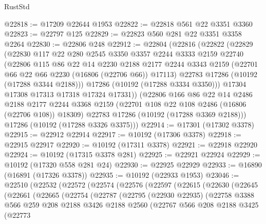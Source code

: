 \begin{lexlean}{RustStd}
\begin{coremodule}
@22818 := @17209 @22644 @1953
@22822 := @22818 @561 @22 @3351 @3360
@22823 := @22797 @125
@22829 := @22823 @560 @281 @22 @3351 @3358 @2264
@22830 := @22806 @248
@22912 := @22804
    (@22816
      (@22822
        (@22829
          (@22830
            @117
            @22
            @280
            @2545
            @3350
            @3357
            @2244
            @3333
            @2159
            @22740
            (@22806
              @115
              @86
              @22
              @14
              @2230
              @2188
              @2177
              @2244
              @3343
              @2159
              (@22701 @66 @22 @66 @2230 (@16806 (@22706 @66)) @17113)
              @22783
              @17286
              (@10192 (@17288 @3344 @2188)))
            @17286
            (@10192 (@17288 @3334 @3350)))
          @17304
          @17308
          @17313
          @17318
          @17324
          @17331))
      (@22806
        @166
        @86
        @22
        @14
        @2486
        @2188
        @2177
        @2244
        @3368
        @2159
        (@22701 @108 @22 @108 @2486 (@16806 (@22706 @108)) @18309)
        @22783
        @17286
        (@10192 (@17288 @3369 @2188)))
      @17286
      (@10192 (@17288 @3326 @3375)))
@22914 := @17301 (@17302 @3378)
@22915 := @22912 @22914
@22917 := @10192 (@17306 @3378)
@22918 := @22915 @22917
@22920 := @10192 (@17311 @3378)
@22921 := @22918 @22920
@22924 := @10192 (@17315 @3378 @281)
@22925 := @22921 @22924
@22929 := @10192 (@17320 @558 @281 @24)
@22930 := @22925 @22929
@22933 := @16890 (@16891 (@17326 @3378))
@22935 := @10192 (@22933 @1953)
@23046 := @22510
    (@22532
      (@22572
        (@22574
          (@22576
            (@22597
              (@22615
                (@22630
                  (@22645
                    (@22661
                      (@22665
                        (@22754
                          (@22787
                            (@22795
                              (@22930 @22935)
                              (@22758
                                @3388
                                @566
                                @259
                                @208
                                @2188
                                @3426
                                @2188
                                @2560
                                (@22767
                                  @566
                                  @208
                                  @2188
                                  @3425
                                  (@22773

\end{coremodule}
\end{lexlean}
